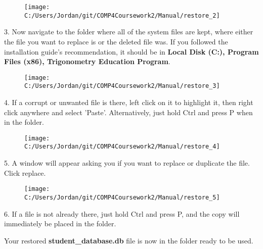\begin{figure}[H]
    \texttt{[image: C:/Users/Jordan/git/COMP4Coursework2/Manual/restore\_2]}
\end{figure}

3. Now navigate to the folder where all of the system files are kept, where either the file you want to replace is or the deleted file was. If you followed the installation guide's recommendation, it should be in \textbf{Local Disk (C:), Program Files (x86), Trigonometry Education Program}.

\begin{figure}[H]
    \texttt{[image: C:/Users/Jordan/git/COMP4Coursework2/Manual/restore\_3]}
\end{figure}

4. If a corrupt or unwanted file is there, left click on it to highlight it, then right click anywhere and select 'Paste'.  Alternatively, just hold Ctrl and press P when in the folder.

\begin{figure}[H]
    \texttt{[image: C:/Users/Jordan/git/COMP4Coursework2/Manual/restore\_4]}
\end{figure}

5. A window will appear asking you if you want to replace or duplicate the file. Click replace.

\begin{figure}[H]
    \texttt{[image: C:/Users/Jordan/git/COMP4Coursework2/Manual/restore\_5]}
\end{figure}

6. If a file is not already there, just hold Ctrl and press P, and the copy will immediately be placed in the folder.

Your restored \textbf{student\_database.db} file is now in the folder ready to be used.